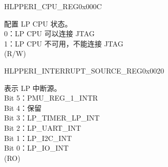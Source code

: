 \begin{register}{H}{LPPERI\_CPU\_REG}{0x000C}\label{regdesc:LPPERICPUREG}
%
%
\regnewline%
\begin{regdesc}\begin{reglist}
\label{fielddesc:LPPERILPCOREDBGMUNAVALIABLE}\item [LPPERI\_LPCORE\_DBGM\_UNAVALIABLE] 配置 LP CPU 状态。\\
0：LP CPU 可以连接 JTAG\\
1：LP CPU 不可用，不能连接 JTAG\\
(R/W)
\end{reglist}\end{regdesc}
\end{register}


\begin{register}{H}{LPPERI\_INTERRUPT\_SOURCE\_REG}{0x0020}\label{regdesc:LPPERIINTERRUPTSOURCEREG}
%
%
\regnewline%
\begin{regdesc}\begin{reglist}
\label{fielddesc:LPPERILPINTERRUPTSOURCE}\item [LPPERI\_LP\_INTERRUPT\_SOURCE] 表示 LP 中断源。\\
Bit 5：PMU\_REG\_1\_INTR\\
Bit 4：保留\\
Bit 3：LP\_TIMER\_LP\_INT\\
Bit 2：LP\_UART\_INT\\
Bit 1：LP\_I2C\_INT\\
Bit 0：LP\_IO\_INT\\
(RO)
\end{reglist}\end{regdesc}
\end{register}